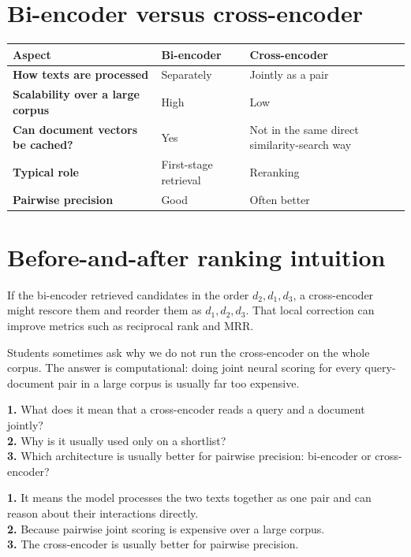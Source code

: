 \documentclass[11pt,oneside]{report}
\begin{document}
\section*{Bi-encoder versus cross-encoder}
\begin{center}
\begin{tabularx}{\textwidth}{>{\bfseries}lYY}
\toprule
Aspect & Bi-encoder & Cross-encoder \\
\midrule
How texts are processed & Separately & Jointly as a pair \\
Scalability over a large corpus & High & Low \\
Can document vectors be cached? & Yes & Not in the same direct similarity-search way \\
Typical role & First-stage retrieval & Reranking \\
Pairwise precision & Good & Often better \\
\bottomrule
\end{tabularx}
\end{center}

\section*{Before-and-after ranking intuition}
If the bi-encoder retrieved candidates in the order $d_2,d_1,d_3$, a cross-encoder might rescore them and reorder them as $d_1,d_2,d_3$. That local correction can improve metrics such as reciprocal rank and MRR.

\begin{warningbox}
Students sometimes ask why we do not run the cross-encoder on the whole corpus. The answer is computational: doing joint neural scoring for every query-document pair in a large corpus is usually far too expensive.
\end{warningbox}

\begin{selfcheckbox}
\textbf{1.} What does it mean that a cross-encoder reads a query and a document jointly?\\
\textbf{2.} Why is it usually used only on a shortlist?\\
\textbf{3.} Which architecture is usually better for pairwise precision: bi-encoder or cross-encoder?
\end{selfcheckbox}

\begin{answerbox}
\textbf{1.} It means the model processes the two texts together as one pair and can reason about their interactions directly.\\
\textbf{2.} Because pairwise joint scoring is expensive over a large corpus.\\
\textbf{3.} The cross-encoder is usually better for pairwise precision.
\end{answerbox}
\end{document}
